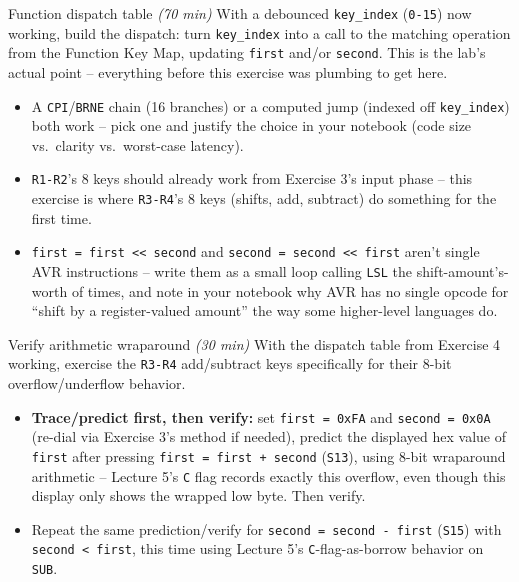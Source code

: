 \documentclass[11pt]{article}
\begin{document}
\begin{labexercise}{Function dispatch table \hfill {\small \itshape (70 min)}}
With a debounced \texttt{key\_index} (\texttt{0-15}) now working, build the
dispatch: turn \texttt{key\_index} into a call to the matching operation from
the Function Key Map, updating \texttt{first} and/or \texttt{second}. This is
the lab's actual point -- everything before this exercise was plumbing to get
here.
\begin{itemize}[nosep,leftmargin=*]
  \item A \texttt{CPI}/\texttt{BRNE} chain (16 branches) or a computed jump
        (indexed off \texttt{key\_index}) both work -- pick one and justify
        the choice in your notebook (code size vs.\ clarity vs.\ worst-case
        latency).
  \item \texttt{R1-R2}'s 8 keys should already work from Exercise 3's input
        phase -- this exercise is where \texttt{R3-R4}'s 8 keys (shifts, add,
        subtract) do something for the first time.
  \item \texttt{first = first << second} and \texttt{second = second << first}
        aren't single AVR instructions -- write them as a small loop calling
        \texttt{LSL} the shift-amount's-worth of times, and note in your
        notebook why AVR has no single opcode for ``shift by a
        register-valued amount'' the way some higher-level languages do.
\end{itemize}
\end{labexercise}

\begin{labexercise}{Verify arithmetic wraparound \hfill {\small \itshape (30 min)}}
With the dispatch table from Exercise 4 working, exercise the \texttt{R3-R4}
add/subtract keys specifically for their 8-bit overflow/underflow behavior.
\begin{itemize}[nosep,leftmargin=*]
  \item \textbf{Trace/predict first, then verify:} set \texttt{first = 0xFA} and
        \texttt{second = 0x0A} (re-dial via Exercise 3's method if needed), predict
        the displayed hex value of \texttt{first} after pressing \texttt{first =
        first + second} (\texttt{S13}), using 8-bit wraparound arithmetic --
        Lecture 5's \texttt{C} flag records exactly this overflow, even though this
        display only shows the wrapped low byte. Then verify.
  \item Repeat the same prediction/verify for \texttt{second = second - first}
        (\texttt{S15}) with \texttt{second < first}, this time using Lecture 5's
        \texttt{C}-flag-as-borrow behavior on \texttt{SUB}.
\end{itemize}
\end{labexercise}
\end{document}

